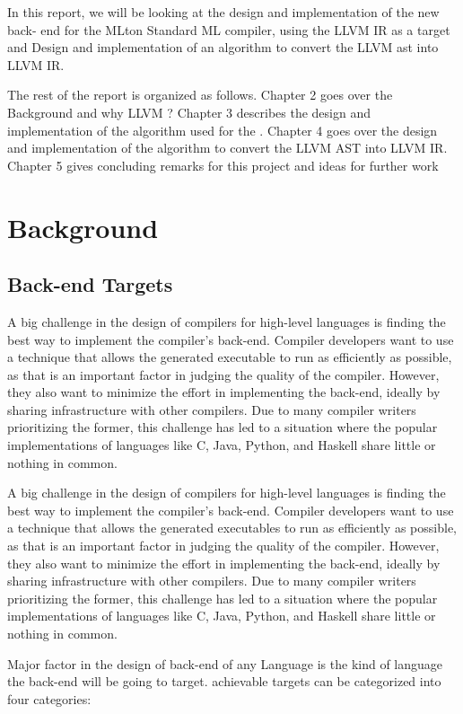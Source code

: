 \documentclass{book}
\begin{document}
In this report, we will be looking at the design and implementation of the new back-
end for the MLton Standard ML compiler, using the LLVM IR as a target and Design and implementation of an algorithm to convert the LLVM ast into LLVM IR.

The rest of the report is organized as follows. Chapter 2 goes over the Background and why LLVM ?  Chapter 3 describes the design
and implementation of the algorithm used for the . Chapter 4 goes over the design and implementation of the algorithm to convert the LLVM AST into LLVM IR. Chapter 5 gives concluding remarks for this project and ideas for further work

\chapter{Background}
\Large
	\section{Back-end Targets}
	A  big  challenge  in  the  design  of  compilers  for  high-level  languages  is  finding  the  best
	way to implement the compiler's back-end.  Compiler developers want to use a technique
	that allows the generated executable to run as efficiently as possible, as that is an important
	factor in judging the quality of the compiler. However, they also want to minimize the effort
	in implementing the back-end, ideally by sharing infrastructure with other compilers. Due
	to many compiler writers prioritizing the former, this challenge has led to a situation where
	the popular implementations of languages like C, Java, Python, and Haskell share little or
	nothing in common.
	
	A  big  challenge  in  the  design  of  compilers  for  high-level  languages  is  finding  the  best
	way to implement the compiler's back-end.  Compiler developers want to use a technique
	that allows the generated executables to run as efficiently as possible, as that is an important
	factor in judging the quality of the compiler. However, they also want to minimize the effort
	in implementing the back-end, ideally by sharing infrastructure with other compilers. Due
	to many compiler writers prioritizing the former, this challenge has led to a situation where
	the popular implementations of languages like C, Java, Python, and Haskell share little or
	nothing in common.
	
	Major factor in the design of back-end of any Language is the kind of language the back-end will be going to target.
	achievable targets can be categorized into four categories:
	
\end{document}
